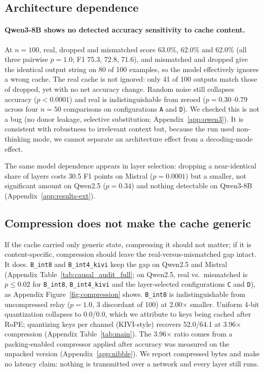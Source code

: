 \documentclass[11pt]{article}
\begin{document}
\subsection{Architecture dependence}

\paragraph{Qwen3-8B shows no detected accuracy sensitivity to cache content.}
At $n{=}100$, real, dropped and mismatched score 63.0\%, 62.0\% and 62.0\% (all
three pairwise $p=1.0$; F1 75.3, 72.8, 71.6), and mismatched and dropped give the
identical output string on 80 of 100 examples, so the model effectively
ignores a wrong cache. The real cache is not ignored: only 41 of 100 outputs match
those of dropped, yet with no net accuracy change. Random noise still collapses
accuracy ($p<0.0001$) and real is indistinguishable from zeroed
($p=0.30$--$0.79$ across four $n{=}50$ comparisons on configurations \texttt{A} and
\texttt{D}). We checked this is not a bug (no donor leakage, selective
substitution; Appendix~\ref{app:qwen3}).
It is consistent with robustness to irrelevant context but, because the
run used non-thinking mode, we cannot separate an architecture effect from
a decoding-mode effect.

The same model dependence appears in layer selection: dropping a near-identical
share of layers costs 30.5 F1 points on Mistral ($p=0.0001$) but a smaller,
not significant amount on Qwen2.5 ($p=0.34$) and nothing detectable on
Qwen3-8B (Appendix~\ref{app:results-ext}).

\subsection{Compression does not make the cache generic}

If the cache carried only generic state, compressing it should not matter; if
it is content-specific, compression should leave the real-versus-mismatched gap
intact. It does. \texttt{B\_int8} and \texttt{B\_int4\_kivi} keep the gap on
Qwen2.5 and Mistral (Appendix Table~\ref{tab:causal_audit_full}; on Qwen2.5, real vs.\ mismatched is
$p\le0.02$ for \texttt{B\_int8}, \texttt{B\_int4\_kivi} and the layer-selected
configurations \texttt{C} and \texttt{D}), as Appendix Figure~\ref{fig:compression} shows.
\texttt{B\_int8} is indistinguishable from uncompressed relay ($p=1.0$, 3
discordant of 100) at 2.00$\times$ smaller. Uniform 4-bit quantization
collapses to 0.0/0.0, which we attribute to keys being cached after RoPE;
quantizing keys per channel (KIVI-style) recovers 52.0/64.1 at 3.96$\times$
compression (Appendix Table~\ref{tab:main}). The 3.96$\times$ ratio comes from a
packing-enabled compressor applied after accuracy was measured on the unpacked
version (Appendix~\ref{app:nibble}). We report compressed bytes and make no
latency claim: nothing is transmitted over a network and every layer still runs.
\end{document}
